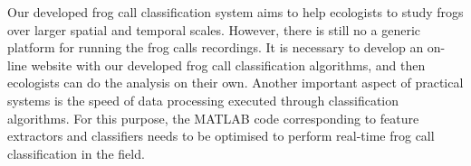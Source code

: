 Our developed frog call classification system aims to help ecologists to study frogs over larger spatial and temporal scales. However, there is still no a generic platform for running the frog calls recordings. It is necessary to develop an on-line website with our developed frog call classification algorithms, and then ecologists can do the analysis on their own. Another important aspect of practical systems is the speed of data processing executed through classification algorithms. For this purpose, the MATLAB code corresponding to feature extractors and classifiers needs to be optimised to perform real-time frog call classification in the field.



